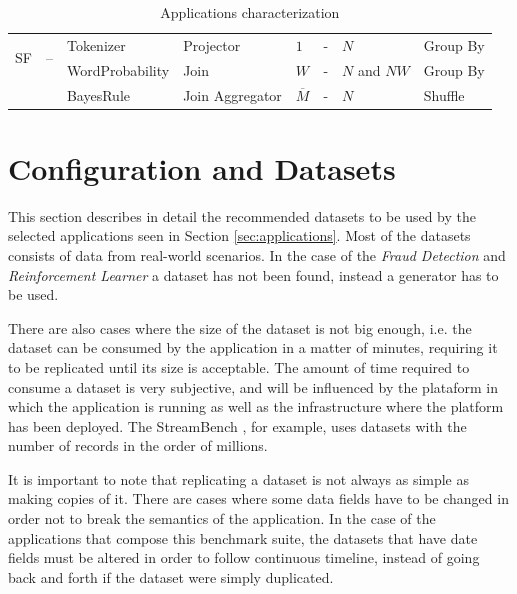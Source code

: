 \documentclass[ppgc,diss,english]{iiufrgs}
\begin{document}
\begin{table}[h]
\begin{center}
\begin{tabular}{ | l | p{2.5cm} | p{2.5cm} | p{2cm} | l | l | l | p{1.5cm} | }
    		\multirow{2}{*}{SF} & \multirow{2}{*}{\parbox[t]{2.5cm}{--}} & Tokenizer       & Projector       & $1$             & - & $N$ & Group By \\\cline{3-8}
    					        &                                        & WordProbability & Join            & $W$             & - & $N$ and $NW$ & Group By \\\cline{3-8}
    					        &                                        & BayesRule       & Join Aggregator & $\overline{M}$  & - & $N$ & Shuffle \\\hline
    		
	\end{tabular}
	\caption{Applications characterization}
	\label{table:app_characteristics}
	
\end{center}
\end{table}




\section{Configuration and Datasets}
\label{sec:configuration_datasets}

This section describes in detail the recommended datasets to be used by the selected applications seen in Section \ref{sec:applications}. Most of the datasets consists of data from real-world scenarios. In the case of the \emph{Fraud Detection} and \emph{Reinforcement Learner} a dataset has not been found, instead a generator has to be used.

There are also cases where the size of the dataset is not big enough, i.e. the dataset can be consumed by the application in a matter of minutes, requiring it to be replicated until its size is acceptable. The amount of time required to consume a dataset is very subjective, and will be influenced by the plataform in which the application is running as well as the infrastructure where the platform has been deployed. The StreamBench \cite{lu2014stream}, for example, uses datasets with the number of records in the order of millions.

It is important to note that replicating a dataset is not always as simple as making copies of it. There are cases where some data fields have to be changed in order not to break the semantics of the application. In the case of the applications that compose this benchmark suite, the datasets that have date fields must be altered in order to follow continuous timeline, instead of going back and forth if the dataset were simply duplicated.
\end{document}
